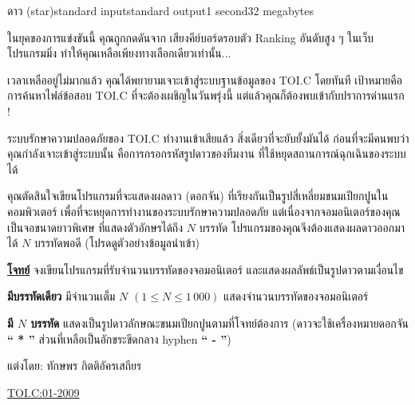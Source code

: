 \documentclass[11pt,a4paper]{article}
\begin{document}
\begin{problem}{ดาว (star)}{standard input}{standard output}{1 second}{32 megabytes}

 ในยุคของการแข่งขันนี้ คุณถูกกดดันจาก เสียงคีย์บอร์ดรอบตัว Ranking อันดับสูง ๆ ในเว็บโปรแกรมมิ่ง ทำให้คุณเหลือเพียงทางเลือกเดียวเท่านั้น...

            เวลาเหลืออยู่ไม่มากแล้ว คุณได้พยายามเจาะเข้าสู่ระบบฐานข้อมูลของ TOI.C โดยทันที เป้าหมายคือการค้นหาไฟล์ข้อสอบ TOI.C ที่จะต้องเผชิญในวันพรุ่งนี้ แต่แล้วคุณก็ต้องพบเข้ากับปราการด่านแรก !

            ระบบรักษาความปลอดภัยของ TOI.C ทำงานเข้าเสียแล้ว สิ่งเดียวที่จะยับยั้งมันได้ ก่อนที่จะมีคนพบว่าคุณกำลังเจาะเข้าสู่ระบบนั้น คือการกรอกรหัสรูปดาวของทีมงาน ที่ใช้หยุดสถานการณ์ฉุกเฉินของระบบได้

            คุณตัดสินใจเขียนโปรแกรมที่จะแสดงผลดาว (ดอกจัน) ที่เรียงกันเป็นรูปสี่เหลี่ยมขนมเปียกปูนในคอมพิวเตอร์ เพื่อที่จะหยุดการทำงานของระบบรักษาความปลอดภัย แต่เนื่องจากจอมอนิเตอร์ของคุณเป็นจอขนาดยาวพิเศษ ที่แสดงตัวอักษรได้ถึง $N$ บรรทัด โปรแกรมของคุณจึงต้องแสดงผลดาวออกมาได้ $N$ บรรทัดพอดี (โปรดดูตัวอย่างข้อมูลนำเข้า)

\underline{\textbf{โจทย์}} จงเขียนโปรแกรมที่รับจำนวนบรรทัดของจอมอนิเตอร์ และแสดงผลลัพธ์เป็นรูปดาวตามเงื่อนไข

\InputFile

\textbf{มีบรรทัดเดียว} มีจำนวนเต็ม $N$ $(1 \leq N \leq 1\,000)$ แสดงจำนวนบรรทัดของจอมอนิเตอร์


\OutputFile

\textbf{มี $N$ บรรทัด} แสดงเป็นรูปดาวลักษณะขนมเปียกปูนตามที่โจทย์ต้องการ (ดาวจะใช้เครื่องหมายดอกจัน \textbf{“ * ”} ส่วนที่เหลือเป็นอักขระขีดกลาง hyphen \textbf{“ - ”})

\Examples

\begin{example}
%
%
%
\end{example}


\Source

แต่งโดย: ทักษพร กิตติอัครเสถียร 

\href{http://thailandoi.org/toi.c/01-2009}{TOI.C:01-2009} 

\end{problem}
\end{document}
